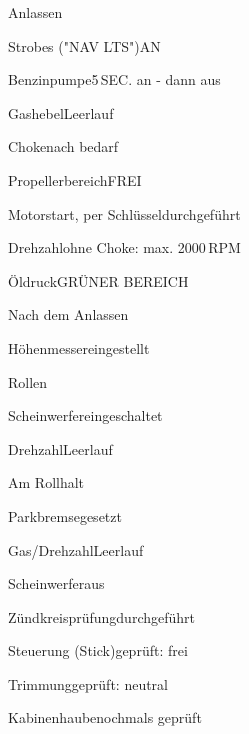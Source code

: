 \begin{checklist}{Anlassen}
	\item{Strobes ("NAV LTS")}{AN}
	\item{Benzinpumpe}{5\,SEC. an - dann aus}
	\item{Gashebel}{Leerlauf}
	\item{Choke}{nach bedarf}
	\item{Propellerbereich}{FREI}
	\item{Motorstart, per Schlüssel}{durchgeführt}
	\item{Drehzahl}{ohne Choke: max. 2000\,RPM}
	\item{Öldruck}{GRÜNER BEREICH}
\end{checklist}

\begin{checklist}{Nach dem Anlassen}
	\item{Höhenmesser}{eingestellt}
\end{checklist}

\begin{checklist}{Rollen}
	\item{Scheinwerfer}{eingeschaltet}
	\item{Drehzahl}{Leerlauf}
\end{checklist}

\begin{checklist}{Am Rollhalt}
	\item{Parkbremse}{gesetzt}
	\item{Gas/Drehzahl}{Leerlauf}
	\item{Scheinwerfer}{aus}
	\item{Zündkreisprüfung}{durchgeführt}
	\item{Steuerung (Stick)}{geprüft: frei}
	\item{Trimmung}{geprüft: neutral}
	\item{Kabinenhaube}{nochmals geprüft}
\end{checklist}

